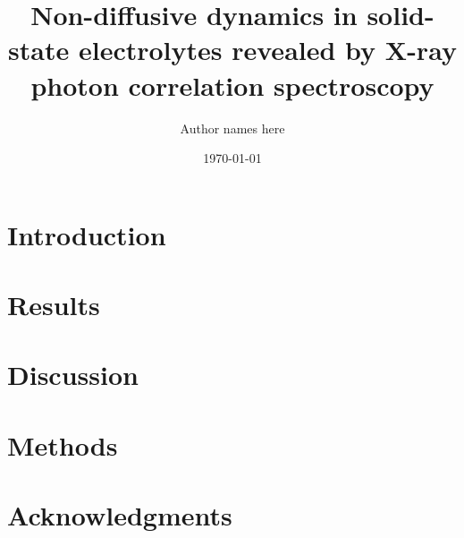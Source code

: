 \documentclass[12pt]{article}
\title{Non-diffusive dynamics in solid-state electrolytes revealed by X-ray photon correlation spectroscopy}
\author{Author names here}
\date{\today}
\begin{document}
\maketitle

\begin{abstract}
\end{abstract}

\section{Introduction}


\section{Results}

\section{Discussion}

\section{Methods}

\section{Acknowledgments}

\appendix




\end{document}
